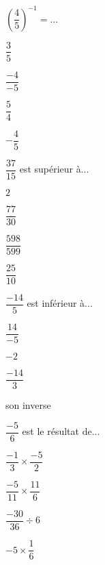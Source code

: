 \begin{QCM}
\begin{GroupeQCM}
\begin{exercice}
$\left(\dfrac{4}{5}\right)^{-1} = ...$
\begin{ChoixQCM}{4}
\item $\dfrac{3}{5}$
\item $\dfrac{-4}{-5}$
\item $\dfrac{5}{4}$
\item $-\dfrac{4}{5}$
\end{ChoixQCM}
\begin{corrige}
\end{corrige}
\end{exercice}


\end{GroupeQCM}


\begin{GroupeQCM}

\begin{exercice}
$\dfrac{37}{15}$ est supérieur à...
\begin{ChoixQCM}{4}
\item $2$
\item $\dfrac{77}{30}$
\item $\dfrac{598}{599}$
\item $\dfrac{25}{10}$
\end{ChoixQCM}
\begin{corrige}
\end{corrige}
\end{exercice}


\begin{exercice}
$\dfrac{-14}{5}$ est inférieur à...
\begin{ChoixQCM}{4}
\item $\dfrac{14}{-5}$
\item $-2$
\item $\dfrac{-14}{3}$
\item son inverse
\end{ChoixQCM}
\begin{corrige}
\end{corrige}
\end{exercice}


\begin{exercice}
$\dfrac{-5}{6}$ est le résultat de...
\begin{ChoixQCM}{4}
\item $\dfrac{-1}{3} \times \dfrac{-5}{2}$
\item $\dfrac{-5}{11} \times \dfrac{11}{6}$
\item $\dfrac{-30}{36} \div 6$
\item $-5 \times \dfrac{1}{6}$
\end{ChoixQCM}
\begin{corrige}
\end{corrige}
\end{exercice}



\end{GroupeQCM}
\end{QCM}
